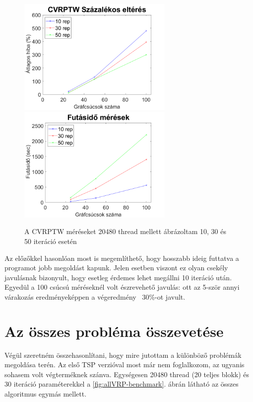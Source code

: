 \begin{figure}[ht!]
	\includegraphics[width=75mm, keepaspectratio]{figures/CVRPTW-benchmark-error.png}
\includegraphics[width=75mm, keepaspectratio]{figures/CVRPTW-benchmark-time.png}
\caption{A CVRPTW méréseket 20480 thread mellett ábrázoltam 10, 30 és 50 iteráció esetén}
\label{fig:CVRPTW-benchmark}
\end{figure}

Az előzőkkel hasonlóan most is megemlíthető, hogy hosszabb ideig futtatva a programot jobb megoldást kapunk. Jelen esetben viszont ez olyan csekély javulásnak bizonyult, hogy esetleg érdemes lehet megállni 10 iteráció után. Egyedül a 100 csúcsú méréseknél volt észrevehető javulás: ott az 5-ször annyi várakozás eredményeképpen a végeredmény ~30\%-ot javult.

\section{Az összes probléma összevetése} \label{sec:allVRPresults}
Végül szeretném összehasonlítani, hogy mire jutottam a különböző problémák megoldása terén. Az első TSP verzióval most már nem foglalkozom, az ugyanis sohasem volt végterméknek szánva. Egységesen 20480 thread (20 teljes blokk) és 30 iteráció paraméterekkel a \ref{fig:allVRP-benchmark}. ábrán látható az összes algoritmus egymás mellett.

